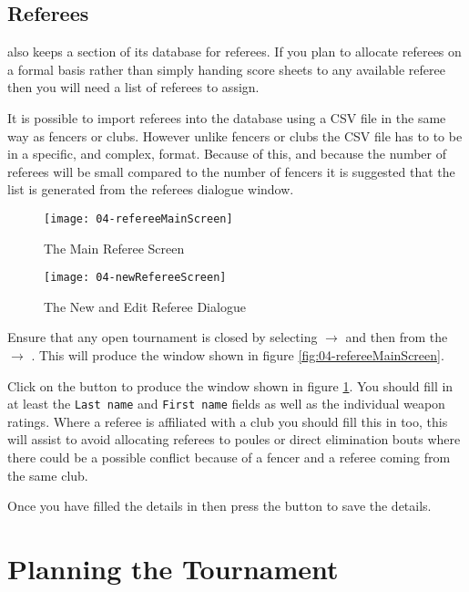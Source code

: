 \documentclass[a4paper,11pt]{memoir}
\begin{document}
\section{Referees}
\fencingtime{} also keeps a section of its database for referees. If you plan to allocate referees on a formal basis rather than simply handing score sheets to any available \gls{referee} then you will need a list of referees to assign.

It is possible to import referees into the database using a CSV file in the same way as fencers or clubs. However unlike fencers or clubs the CSV file has to to be in a specific, and complex, format. Because of this, and because the number of referees will be small compared to the number of fencers it is suggested that the list is generated from the referees dialogue window.

\begin{figure}[!ht]
 \centering
 \begin{minipage}{0.4\textwidth}
 \centering
 \texttt{[image: 04-refereeMainScreen]}
 \caption{The Main Referee Screen} \label{fig:04-refereeMainScreen}  
 \end{minipage}
 \hfill
 \begin{minipage}{0.4\textwidth}
 \centering
 \texttt{[image: 04-newRefereeScreen]}
 \caption{The New and Edit Referee Dialogue} \label{fig:04-newRefereeScreen}    
 \end{minipage}
\end{figure}

Ensure that any open tournament is closed by selecting  $\rightarrow$  and then from the  $\rightarrow$ . This will produce the window shown in figure \ref{fig:04-refereeMainScreen}.

Click on the  button to produce the window shown in figure \ref{fig:04-newRefereeScreen}. You should fill in at least the \texttt{Last name} and \texttt{First name} fields as well as the individual weapon ratings. Where a referee is affiliated with a club you should fill this in too, this will assist \fencingtime{} to avoid allocating referees to poules or direct elimination bouts where there could be a possible conflict because of a fencer and a referee coming from the same club.

Once you have filled the details in then press the  button to save the details.

\chapter{Planning the Tournament}
\end{document}
